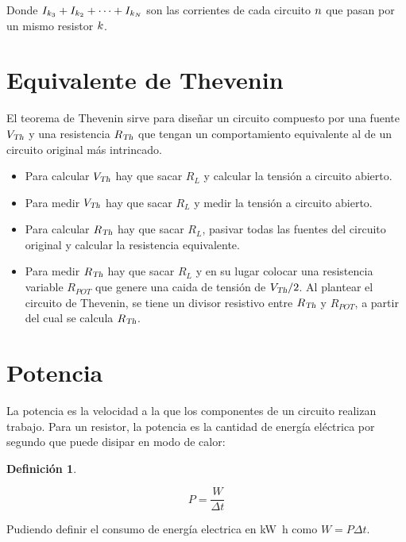 \documentclass[a5paper,12pt,twoside]{book}
\newtheorem{defn}{{Definición}}[chapter]
\begin{document}
Donde $I_{k_3} + I_{k_2} + \dots + I_{k_N}$ son las corrientes de cada circuito $n$ que pasan por un mismo resistor $k$.


\section{Equivalente de Thevenin}

El teorema de Thevenin sirve para diseñar un circuito compuesto por una fuente ${{V}_\textsl{{Th}}}$ y una resistencia ${{R}_\textsl{{Th}}}$ que tengan un comportamiento equivalente al de un circuito original más intrincado.

\begin{itemize}
\item Para calcular ${{V}_\textsl{{Th}}}$ hay que sacar $R_L$ y calcular la tensión a circuito abierto.
\item Para medir ${{V}_\textsl{{Th}}}$ hay que sacar $R_L$ y medir la tensión a circuito abierto.
\item Para calcular ${{R}_\textsl{{Th}}}$ hay que sacar $R_L$, pasivar todas las fuentes del circuito original y calcular la resistencia equivalente.
\item Para medir ${{R}_\textsl{{Th}}}$ hay que sacar $R_L$ y en su lugar colocar una resistencia variable $R_{POT}$ que genere una caida de tensión de ${{V}_\textsl{{Th}}}/2$.
Al plantear el circuito de Thevenin, se tiene un divisor resistivo entre ${{R}_\textsl{{Th}}}$ y $R_{POT}$, a partir del cual se calcula ${{R}_\textsl{{Th}}}$.
\end{itemize}


\section{Potencia}

La potencia es la velocidad a la que los componentes de un circuito realizan trabajo.
Para un resistor, la potencia es la cantidad de energía eléctrica por segundo que puede disipar en modo de calor:

\begin{mdframed}[style=MyFrame1]
    \begin{defn}
    \end{defn}
    \begin{equation*}
        P = \frac{W}{\Delta t}
    \end{equation*}
\end{mdframed}

Pudiendo definir el consumo de energía electrica en \si{\kilo\watt\hour} como $W = P \Delta t$.
\end{document}
